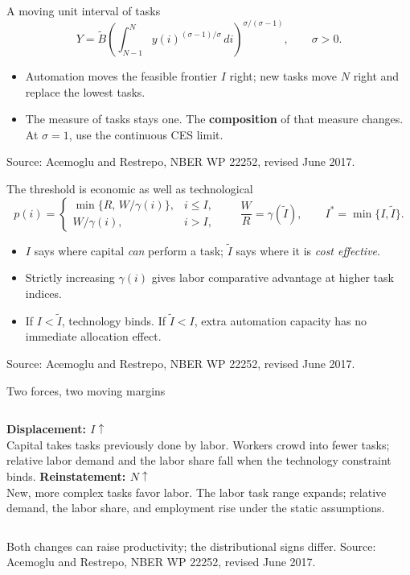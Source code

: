\documentclass[aspectratio=169,11pt]{beamer}
\newcommand{\key}[1]{{\color{accent}\bfseries #1}}
\newcommand{\sourcefoot}{\vfill{\color{muted}\scriptsize Source: Acemoglu and Restrepo, NBER WP 22252, revised June 2017.}}
\begin{document}
\begin{frame}{A moving unit interval of tasks}
\[
Y=\widetilde B\left(\int_{N-1}^{N}y(i)^{(\sigma-1)/\sigma}\,di\right)^{\sigma/(\sigma-1)},\qquad \sigma>0.
\]
\begin{center}
\end{center}
\begin{itemize}
\item Automation moves the feasible frontier $I$ right; new tasks move $N$ right and replace the lowest tasks.
\item The measure of tasks stays one. The \key{composition} of that measure changes. At $\sigma=1$, use the continuous CES limit.
\end{itemize}
\sourcefoot
\end{frame}

\begin{frame}{The threshold is economic as well as technological}
\[
p(i)=\begin{cases}
\min\{R,\,W/\gamma(i)\},&i\leq I,\\
W/\gamma(i),&i>I,
\end{cases}
\qquad \frac{W}{R}=\gamma(\widetilde I),\qquad I^*=\min\{I,\widetilde I\}.
\]
\begin{itemize}\setlength\itemsep{0.55em}
\item $I$ says where capital \emph{can} perform a task; $\widetilde I$ says where it is \emph{cost effective}.
\item Strictly increasing $\gamma(i)$ gives labor comparative advantage at higher task indices.
\item If $I<\widetilde I$, technology binds. If $\widetilde I<I$, extra automation capacity has no immediate allocation effect.
\end{itemize}
\sourcefoot
\end{frame}

\begin{frame}{Two forces, two moving margins}
\begin{columns}[T,onlytextwidth]
\key{Displacement: $I\uparrow$}\\[0.5em]
Capital takes tasks previously done by labor. Workers crowd into fewer tasks; relative labor demand and the labor share fall when the technology constraint binds.
\key{Reinstatement: $N\uparrow$}\\[0.5em]
New, more complex tasks favor labor. The labor task range expands; relative demand, the labor share, and employment rise under the static assumptions.
\end{columns}
\vspace{0.85em}
\centering\large Both changes can raise productivity; the distributional signs differ.
\sourcefoot
\end{frame}
\end{document}
